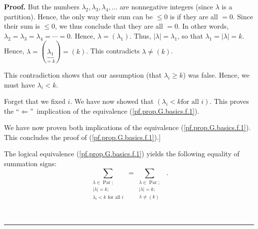 \documentclass[numbers=enddot,12pt,final,onecolumn,notitlepage]{scrartcl}%
\theoremstyle{definition}
\newenvironment{proof}[1][Proof]{\noindent\textbf{#1.} }{\ \rule{0.5em}{0.5em}}
\let\sumnonlimits\sum
\renewcommand{\sum}{\sumnonlimits\limits}
\newenvironment{verlong}{}{}
\begin{document}
\begin{verlong}
\begin{proof}
But the numbers $\lambda_{2},\lambda_{3},\lambda_{4},\ldots$ are nonnegative
integers (since $\lambda$ is a partition). Hence, the only way their sum can
be $\leq0$ is if they are all $=0$. Since their sum is $\leq0$, we thus
conclude that they are all $=0$. In other words, $\lambda_{2}=\lambda
_{3}=\lambda_{4}=\cdots=0$. Hence, $\lambda=\left(  \lambda_{1}\right)  $.
Thus, $\left\vert \lambda\right\vert =\lambda_{1}$, so that $\lambda
_{1}=\left\vert \lambda\right\vert =k$. Hence, $\lambda=\left(
\underbrace{\lambda_{1}}_{=k}\right)  =\left(  k\right)  $. This contradicts
$\lambda\neq\left(  k\right)  $.

This contradiction shows that our assumption (that $\lambda_{i}\geq k$) was
false. Hence, we must have $\lambda_{i}<k$.

Forget that we fixed $i$. We have now showed that $\left(  \lambda_{i}<k\text{
for all }i\right)  $. This proves the \textquotedblleft$\Longleftarrow
$\textquotedblright\ implication of the equivalence
(\ref{pf.prop.G.basics.f.1}).

We have now proven both implications of the equivalence
(\ref{pf.prop.G.basics.f.1}). This concludes the proof of
(\ref{pf.prop.G.basics.f.1}).]

The logical equivalence (\ref{pf.prop.G.basics.f.1}) yields the following
equality of summation signs:%
\begin{equation}
\sum_{\substack{\lambda\in\operatorname*{Par};\\\left\vert \lambda\right\vert
=k;\\\lambda_{i}<k\text{ for all }i}}=\sum_{\substack{\lambda\in
\operatorname*{Par};\\\left\vert \lambda\right\vert =k;\\\lambda\neq\left(
k\right)  }}\ \ . \label{pf.prop.G.basics.f.1sum=sum}%
\end{equation}



\end{proof}
\end{verlong}
\end{document}
